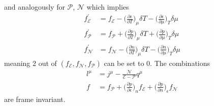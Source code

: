 and analogously for $\mathcal{P}$, $\mathcal{N}$ which implies
\begin{subequations}
    \begin{align}
        f^\prime_{\mathcal{E}} & =f_\mathcal{E}-\Big(\frac{\partial\epsilon}{\partial T}\Big)_\mu\delta T-\Big(\frac{\partial\epsilon}{\partial \mu}\Big)_T\delta \mu \\
        f^\prime_{\mathcal{P}} & =f_\mathcal{P}+\Big(\frac{\partial p}{\partial T}\Big)_\mu\delta T+\Big(\frac{\partial p}{\partial \mu}\Big)_T\delta \mu             \\
        f^\prime_{\mathcal{N}} & =f_\mathcal{N}-\Big(\frac{\partial n}{\partial T}\Big)_\mu\delta T-\Big(\frac{\partial n}{\partial \mu}\Big)_T\delta \mu
    \end{align}
\end{subequations}
meaning 2 out of $(f_{\mathcal{E}},f_{\mathcal{N}},f_{\mathcal{P}})$ can be set to 0. The combinations
\begin{subequations}
    \begin{align}
        l^\mu & =j^\mu-\frac{\mathcal{N}}{\mathcal{E}-\mathcal{P}}q^\mu                                                                                           \\
        f     & =f_{\mathcal{P}}+\Big(\frac{\partial p}{\partial\epsilon}\Big)_n f_{\mathcal{E}}+\Big(\frac{\partial p}{\partial n}\Big)_\epsilon f_{\mathcal{N}}
    \end{align}
\end{subequations}
are frame invariant.

